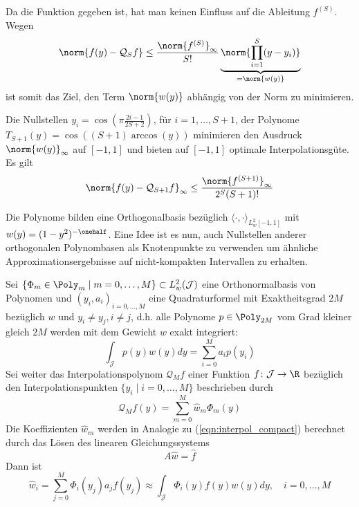 Da die Funktion gegeben ist, hat man keinen Einfluss auf die Ableitung $f^{(S)}$. Wegen
\[\norm{f(y)-\mathcal{Q}_{S}f}\le \frac{\norm{f^{(S)}}_\infty}{S!}\underbrace{\norm{\prod_{i=1}^{S}(y-y_i)}}_{=\norm{w(y)}}\]
ist somit das Ziel, den Term $\norm{w(y)}$ abhängig von der Norm zu minimieren.
\begin{mathbem}
\label{bem:cheby}
Die Nullstellen $y_i=\cos\left(\pi\frac{2i-1}{2S+2}\right)$, für $i=1,\dots,S+1$, der \chebyspace Polynome $T_{S+1}(y)=\cos((S+1)\arccos(y))$ minimieren den Ausdruck $\norm{w(y)}_\infty$ auf $[-1,1]$ und bieten auf $[-1,1]$ optimale Interpolationsgüte. Es gilt 
\[\norm{f(y)-\mathcal{Q}_{S+1}f}_\infty\le \frac{\norm{f^{(S+1)}}_\infty}{2^S(S+1)!}\]
\end{mathbem}
Die \chebyspace Polynome bilden eine Orthogonalbasis bezüglich $\langle \cdot,\cdot\rangle_{L_w^2[-1,1]}$ mit $w(y)=(1-y^2)^{-\onehalf}$. Eine Idee ist es nun, auch Nullstellen anderer orthogonalen Polynombasen als Knotenpunkte zu verwenden um ähnliche Approximationsergebnisse auf nicht-kompakten Intervallen zu erhalten.
\begin{maththeorem}
\label{th:interpol_and_proj}
Sei $\lbrace \Phi_m\in\Poly_m\mid m=0,\dots,M\rbrace\subset L_w^2(\mathcal{J})$ eine Orthonormalbasis von Polynomen und $(y_i,a_i)_{i=0,\dots,M}$ eine Quadraturformel mit Exaktheitsgrad $2M$ bezüglich $w$ und $y_i\neq y_j,i\neq j$, d.h. alle Polynome $p\in\Poly_{2M}$ vom Grad kleiner gleich $2M$ werden mit dem Gewicht $w$ exakt integriert:
\[\int_\mathcal{J} p(y)w(y)dy=\sum_{i=0}^M a_ip(y_i)\]
Sei weiter das Interpolationspolynom  $\mathcal{Q}_Mf$ einer Funktion $f\colon \mathcal{J}\to\R$ bezüglich den Interpolationspunkten $\lbrace y_i\mid i=0,\dots,M\rbrace$ beschrieben durch
\[\mathcal{Q}_Mf(y)=\sum_{m=0}^M\hat{w}_m\Phi_m(y)\]
Die Koeffizienten $\hat{w}_m$ werden in Analogie zu (\ref{eqn:interpol_compact}) berechnet durch das Lösen des linearen Gleichungssystems
\[A\hat{w}=\hat{f}\]
Dann ist \[\hat{w}_i=\sum_{j=0}^M\Phi_i(y_j)a_jf(y_j)\approx \int_\mathcal{J} \Phi_i(y)f(y)w(y)dy,\quad i=0,\dots,M\]
\end{maththeorem}
